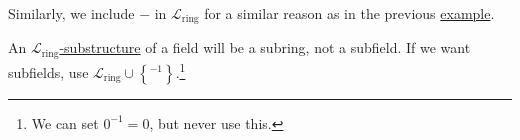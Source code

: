 Similarly, we include \(-\) in \(\mathcal{L} _{\text{ring}}\) for a similar reason as in the previous \hyperref[eg:language-ring]{example}.

\begin{eg}
	An \hyperref[def:substructure]{\(\mathcal{L} _{\text{ring} }\)-substructure} of a field will be a subring, not a subfield. If we want subfields, use \(\mathcal{L} _{\text{ring} } \cup \left\{ ^{-1} \right\} \).\footnote{We can set \(0^{-1} = 0\), but never use this.}
\end{eg}
